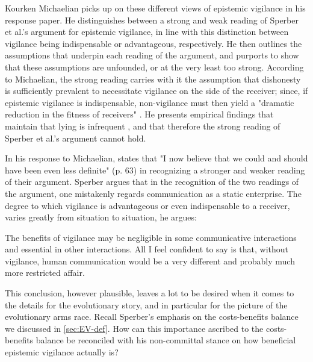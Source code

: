 Kourken Michaelian picks up on these different views of epistemic vigilance in his \citeyear{Michaelian13} response paper. He distinguishes between a strong and weak reading of Sperber et al.'s argument for epistemic vigilance, in line with this distinction between vigilance being indispensable or advantageous, respectively.
He then outlines the assumptions that underpin each reading of the argument, and purports to show that these assumptions are unfounded, or at the very least too strong.
According to Michaelian, the strong reading carries with it the assumption that dishonesty is sufficiently prevalent to necessitate vigilance on the side of the receiver; since, if epistemic vigilance is indispensable, non-vigilance must then yield a "dramatic reduction in the fitness of receivers" \citep[p.~39]{Michaelian13}. He presents empirical findings that maintain that lying is infrequent \citep{Serota10}, and that therefore the strong reading of Sperber et al.'s argument cannot hold.

In his response to Michaelian, \citet{Sperber13} states that "I now believe that we could and should have been even less definite" (p. 63) in recognizing a stronger and weaker reading of their argument. Sperber argues that in the recognition of the two readings of the argument, one mistakenly regards communication as a static enterprise. The degree to which vigilance is advantageous or even indispensable to a receiver, varies greatly from situation to situation, he argues:
\begin{quoting}
    The benefits of vigilance may be negligible in some communicative interactions and essential in other interactions. All I feel confident to say is that, without vigilance, human communication would be a very different and probably much more restricted affair.
    \hfill \citep[p.~63]{Sperber13}
\end{quoting}
This conclusion, however plausible, leaves a lot to be desired when it comes to the details for the evolutionary story, and in particular for the picture of the evolutionary arms race.
Recall Sperber's emphasis on the costs-benefits balance we discussed in \cref{sec:EV-def}. How can this importance ascribed to the costs-benefits balance be reconciled with his non-committal stance on how beneficial epistemic vigilance actually is?


